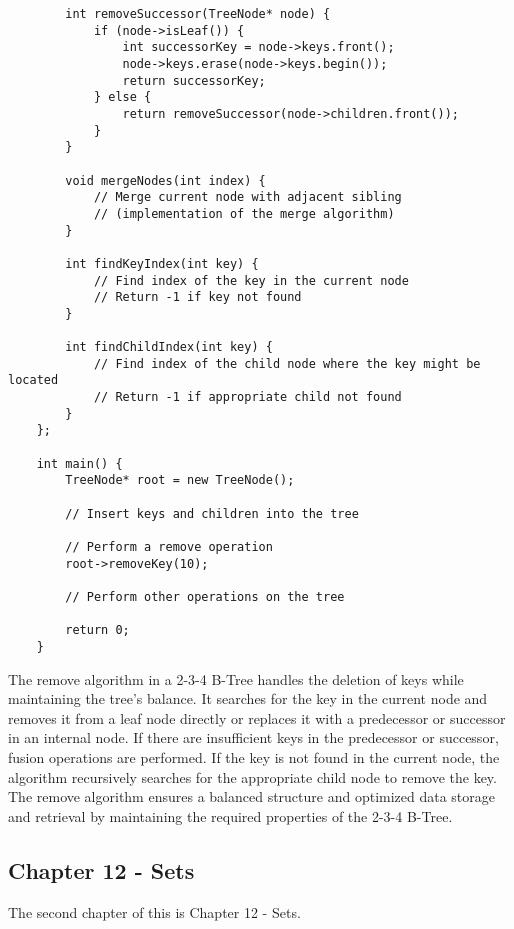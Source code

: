 \begin{solution}
\begin{verbatim}
        int removeSuccessor(TreeNode* node) {
            if (node->isLeaf()) {
                int successorKey = node->keys.front();
                node->keys.erase(node->keys.begin());
                return successorKey;
            } else {
                return removeSuccessor(node->children.front());
            }
        }
    
        void mergeNodes(int index) {
            // Merge current node with adjacent sibling
            // (implementation of the merge algorithm)
        }
    
        int findKeyIndex(int key) {
            // Find index of the key in the current node
            // Return -1 if key not found
        }
    
        int findChildIndex(int key) {
            // Find index of the child node where the key might be located
            // Return -1 if appropriate child not found
        }
    };
    
    int main() {
        TreeNode* root = new TreeNode();
    
        // Insert keys and children into the tree
    
        // Perform a remove operation
        root->removeKey(10);
    
        // Perform other operations on the tree
    
        return 0;
    }        
    \end{verbatim}

    \horizontalline

    The remove algorithm in a 2-3-4 B-Tree handles the deletion of keys while maintaining the tree's balance. It searches for the key in the current node and removes it from a leaf node directly or replaces it with a predecessor or successor in an internal node. If there are insufficient keys in the predecessor or successor, fusion 
    operations are performed. If the key is not found in the current node, the algorithm recursively searches for the appropriate child node to remove the key. The remove algorithm ensures a balanced structure and optimized data storage and retrieval by maintaining the required properties of the 2-3-4 B-Tree.
\end{solution}

\subsection{Chapter 12 - Sets}

The second chapter of this is Chapter 12 - Sets.

